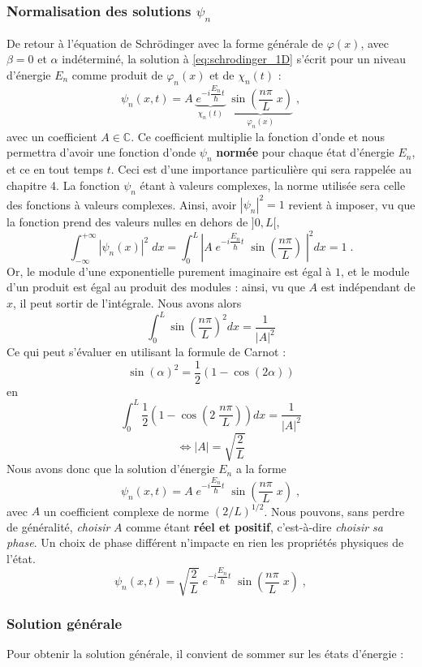 \documentclass{book}
\begin{document}
\subsubsection{Normalisation des solutions $\psi_n$}
De retour à l'équation de Schrödinger avec la forme générale de $\varphi(x)$, avec $\beta = 0$ et $\alpha$ indéterminé, la solution à \eqref{eq:schrodinger_1D} s'écrit pour un niveau d'énergie $E_n$ comme produit de $\varphi_n(x)$ et de $\chi_n(t)$ :
$$\psi_n(x,t) = A \; \underbrace{e^{-i \dfrac{E_n}{\hbar}t}}_{\chi_n(t)} \; \underbrace{\sin\left(\dfrac{n\pi}{L} \; x\right)}_{\varphi_n(x)} \; ,$$
avec un coefficient $A \in \mathbb{C}$. Ce coefficient multiplie la fonction d'onde et nous permettra d'avoir une fonction d'onde $\psi_n$ \textbf{normée} pour chaque état d'énergie $E_n$, et ce en tout temps $t$. Ceci est d'une importance particulière qui sera rappelée au chapitre 4. La fonction $\psi_n$ étant à valeurs complexes, la norme utilisée sera celle des fonctions à valeurs complexes. Ainsi, avoir $|\psi_n|^2 = 1$ revient à imposer, vu que la fonction prend des valeurs nulles en dehors de $]0,L[$, 
$$
\int_{-\infty} ^{+\infty} |\psi_n(x)|^2 \; dx = \int_{0} ^{L}\left| A \; e^{-i \dfrac{E_n}{\hbar}t} \; \sin \left(\dfrac{n\pi}{L}\right)\;\right|^2 dx =  1
\; .
$$
Or, le module d'une exponentielle purement imaginaire est égal à $1$, et le module d'un produit est égal au produit des modules : ainsi, vu que $A$ est indépendant de $x$, il peut sortir de l'intégrale. Nous avons alors
$$
\int_{0} ^{L} \sin\left(\dfrac{n\pi}{L}\right)^2 dx = \dfrac{1}{|A|^2}
$$
Ce qui peut s'évaluer en utilisant la formule de Carnot :
$$
\sin(\alpha)^2 = \frac{1 }{2}(1-\cos(2\alpha))
$$
en 
$$
\int_{0} ^{L} \dfrac{1 }{2}\left(1-\cos\left(2\; \dfrac{n\pi}{L}\right)\right) dx = \dfrac{1}{|A|^2}
$$
$$
\iff |A| = \sqrt{\dfrac{2}{L}}
$$
Nous avons donc que la solution d'énergie $E_n$ a la forme
$$\psi_n(x,t) = A \; e^{-i \dfrac{E_n}{\hbar}t} \; \sin\left(\dfrac{n\pi}{L} \; x\right) \; ,$$
avec $A$ un coefficient complexe de norme $(2/L)^{1/2}$. Nous pouvons, sans perdre de généralité, \textit{choisir} $A$ comme étant \textbf{réel et positif}, c'est-à-dire \textit{choisir sa phase}. Un choix de phase différent n'impacte en rien les propriétés physiques de l'état.
$$\psi_n(x,t) = \sqrt{\dfrac{2 }{L}} \; e^{-i \dfrac{E_n}{\hbar}t} \; \sin\left(\dfrac{n\pi}{L} \; x\right) \; ,$$

\subsubsection{Solution générale}
Pour obtenir la solution générale, il convient de sommer sur les états d'énergie :
\end{document}
